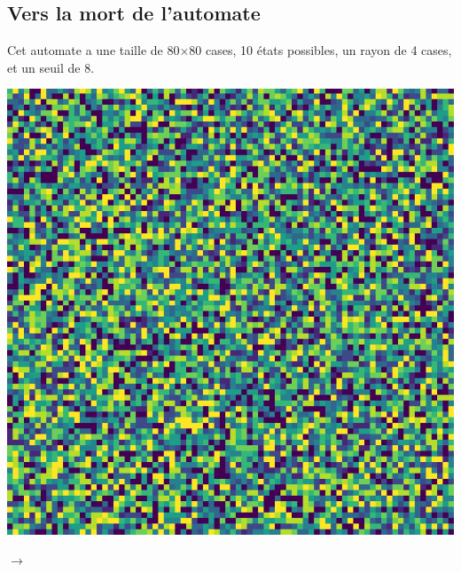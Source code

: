 \documentclass[12pt, a4paper]{article}
\begin{document}
        \subsection{Vers la mort de l'automate}
            \begin{flushleft}
                Cet automate a une taille de 80$\times$80 cases, 10 états possibles, un rayon de 4 cases, et un seuil de 8.
            \end{flushleft}
            \begin{center}
                \begin{minipage}{.17\linewidth}
                    \includegraphics[scale=0.15]{img/part3/2/step1.png}
                \end{minipage}
                $\rightarrow$
                \begin{minipage}{.17\linewidth}

\end{minipage}
\end{center}
\end{document}
